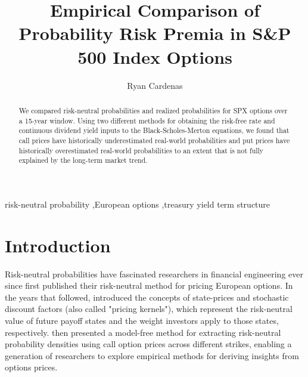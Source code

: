 \documentclass[final,3p,times,authoryear]{elsarticle}
\begin{document}
\begin{frontmatter}

    \title{Empirical Comparison of Probability Risk Premia in S\&P 500 Index Options}

    \author{Ryan Cardenas}

  
    \begin{abstract}
    We compared risk-neutral probabilities and realized probabilities for SPX options over a 15-year window. Using two different methods for obtaining the risk-free rate and continuous dividend yield inputs to the Black-Scholes-Merton equations, we found that call prices have historically underestimated real-world probabilities and put prices have historically overestimated real-world probabilities to an extent that is not fully explained by the long-term market trend.
    \end{abstract}

    \begin{keyword} %
      risk-neutral probability \sep European options \sep treasury yield term structure
    \end{keyword}
    
\end{frontmatter}


\section{Introduction}
  Risk-neutral probabilities have fascinated researchers in financial engineering ever since \citet{black_pricing_1973} first published their risk-neutral method for pricing European options. In the years that followed, \citet{ross_arbitrage_1976} introduced the concepts of state-prices and stochastic discount factors (also called "pricing kernels"), which represent the risk-neutral value of future payoff states and the weight investors apply to those states, respectively. \citet{breeden_prices_1978} then presented a model-free method for extracting risk-neutral probability densities using call option prices across different strikes, enabling a generation of researchers to explore empirical methods for deriving insights from options prices.
\end{document}
